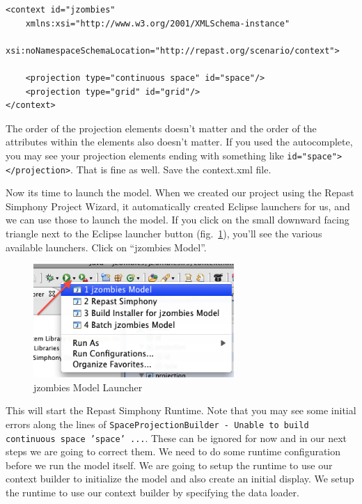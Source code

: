 \documentclass[11pt]{amsart}
\begin{document}
\noindent\begin{minipage}[h]{\textwidth}
\vspace{.2in}
\lstset{language=java,caption=JZombiesBuilder.build Complete }
\begin{lstlisting}
<context id="jzombies"
	xmlns:xsi="http://www.w3.org/2001/XMLSchema-instance"
	xsi:noNamespaceSchemaLocation="http://repast.org/scenario/context">
	
	<projection type="continuous space" id="space"/>
	<projection type="grid" id="grid"/>
</context>

\end{lstlisting}
\vspace{.2in}
\end{minipage}
The order of the projection elements doesn't matter and the order of the attributes within the elements also doesn't matter. If you used the autocomplete, you   may see your projection elements ending with something like \texttt{id="space"></projection>}. That is fine as well. Save the context.xml file.

Now its time to launch the model. When we created our project using the Repast Simphony Project Wizard, it automatically created Eclipse launchers for us, and we can use those to launch the model. If you click on the small downward facing triangle next to the Eclipse launcher button (fig.~\ref{fig:launch}), you'll see the various available launchers. Click on ``jzombies Model''.

\begin{figure}[h]
\begin{center}
\vspace{.2in}
\centerline {
\includegraphics[width=3in]{GettingStartedImages/launcher.png}
}
\caption{jzombies Model Launcher}
\label{fig:launch}
\end{center}
\end{figure}

This will start the Repast Simphony Runtime. Note that you may see some initial errors along the lines of \texttt{SpaceProjectionBuilder - Unable to build continuous space 'space' ...}. These can be ignored for now and in our next steps we are going to correct them. We need to do some runtime configuration before we run the model itself. We are going to setup the runtime to use our context builder to initialize the model and also create an initial display. We setup the runtime to use our context builder by specifying the data loader.
\end{document}
